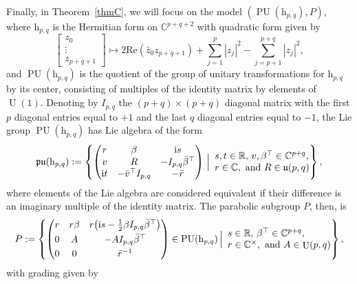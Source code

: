 \documentclass[10pt,a4paper]{amsart}
\numberwithin{equation}{section}
\theoremstyle{definition}
\DeclareMathOperator{\Utry}{\mathrm{U}}
\DeclareMathOperator{\PU}{\mathrm{PU}}
\begin{document}
Finally, in Theorem~\ref{thmC}, we will focus on the model $(\PU(\mathrm{h}_{p,q}),P)$, where $\mathrm{h}_{p,q}$ is the Hermitian form on $\mathbb{C}^{p+q+2}$ with quadratic form given by \[\begin{bmatrix}z_0 \\ \vdots \\ z_{p+q+1}\end{bmatrix}\mapsto 2\mathrm{Re}(\bar{z}_0z_{p+q+1})+\sum_{j=1}^p |z_j|^2-\sum_{j=p+1}^{p+q}|z_j|^2,\] and $\PU(\mathrm{h}_{p,q})$ is the quotient of the group of unitary transformations for $\mathrm{h}_{p,q}$ by its center, consisting of multiples of the identity matrix by elements of $\Utry(1)$. Denoting by $I_{p,q}$ the ${(p+q)}\times(p+q)$ diagonal matrix with the first $p$ diagonal entries equal to $+1$ and the last $q$ diagonal entries equal to $-1$, the Lie group $\PU(\mathrm{h}_{p,q})$ has Lie algebra of the form
\[\mathfrak{pu}(\mathrm{h}_{p,q}):=\left\{\begin{pmatrix}r & \beta & \mathrm{i}s \\ v & R & -I_{p,q}\bar{\beta}^\top \\ \mathrm{i}t & -\bar{v}^\top I_{p,q} & -\bar{r}\end{pmatrix}\,\Big| \begin{array}{l@{}} s,t\in\mathbb{R},\, v,\beta^\top\in\mathbb{C}^{p+q}, \\ r\in\mathbb{C},\text{ and } R\in\mathfrak{u}(p,q)\end{array}\right\},\]
where elements of the Lie algebra are considered equivalent if their difference is an imaginary multiple of the identity matrix. The parabolic subgroup $P$, then, is
\[P:=\left\{\begin{pmatrix}r & r\beta & r\bigl(\mathrm{i}s-\tfrac{1}{2}\beta I_{p,q}\bar{\beta}^\top\bigr) \vspace{1mm}\\ 0 & A & -AI_{p,q}\bar{\beta}^\top \vspace{1mm}\\ 0 & 0 & \bar{r}^{-1}\end{pmatrix}\in\PU(\mathrm{h}_{p,q})\,\Big| \begin{array}{l@{}} s\in\mathbb{R},\, \beta^\top\in\mathbb{C}^{p+q}, \\ r\in\mathbb{C}^\times,\text{ and }A\in\Utry(p,q)\end{array}\right\},\]
with grading given by
\end{document}
